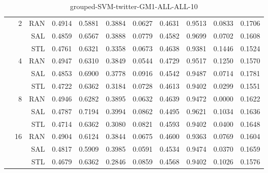 \begin{center}
\begin{table}[htbp]
\begin{center}
\begin{tabular}{ | r | r | r | r | r | r | r | r | r | r | r |}
 & \multirow{3}{*}{2} & RAN & 0.4914 & 0.5881 & 0.3884 & 0.0627 & 0.4631 & 0.9513 & 0.0833 & 0.1706\\ \cline{3-11}
 &   & SAL & 0.4859 & 0.6567 & 0.3888 & 0.0779 & 0.4582 & 0.9699 & 0.0702 & 0.1608\\ \cline{3-11}
 &   & STL & 0.4761 & 0.6321 & 0.3358 & 0.0673 & 0.4638 & 0.9381 & 0.1446 & 0.1524\\ \cline{2-11}
 & \multirow{3}{*}{4} & RAN & 0.4947 & 0.6310 & 0.3849 & 0.0544 & 0.4729 & 0.9517 & 0.1250 & 0.1570\\ \cline{3-11}
 &   & SAL & 0.4853 & 0.6900 & 0.3778 & 0.0916 & 0.4542 & 0.9487 & 0.0714 & 0.1781\\ \cline{3-11}
 &   & STL & 0.4722 & 0.6362 & 0.3184 & 0.0728 & 0.4613 & 0.9402 & 0.0299 & 0.1551\\ \cline{2-11}
 & \multirow{3}{*}{8} & RAN & 0.4946 & 0.6282 & 0.3895 & 0.0632 & 0.4639 & 0.9472 & 0.0000 & 0.1622\\ \cline{3-11}
 &   & SAL & 0.4787 & 0.7194 & 0.3994 & 0.0862 & 0.4495 & 0.9621 & 0.1034 & 0.1636\\ \cline{3-11}
 &   & STL & 0.4714 & 0.6362 & 0.3080 & 0.0821 & 0.4593 & 0.9402 & 0.0400 & 0.1648\\ \cline{2-11}
 & \multirow{3}{*}{16} & RAN & 0.4904 & 0.6124 & 0.3844 & 0.0675 & 0.4600 & 0.9363 & 0.0769 & 0.1604\\ \cline{3-11}
 &   & SAL & 0.4817 & 0.5909 & 0.3985 & 0.0591 & 0.4534 & 0.9474 & 0.0370 & 0.1659\\ \cline{3-11}
 &   & STL & 0.4679 & 0.6362 & 0.2846 & 0.0859 & 0.4568 & 0.9402 & 0.1026 & 0.1576\\ \cline{2-11}
\hline
\end{tabular}
\caption{grouped-SVM-twitter-GM1-ALL-ALL-10}
\end{center}
 \end{table}
\end{center}

